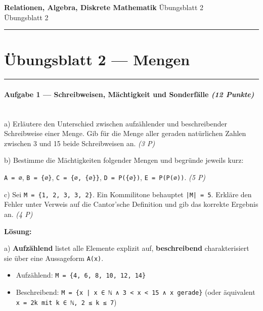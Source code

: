 \documentclass[11pt, a4paper]{article}
\providecommand{\nichttitle}{Übungsblatt}
\providecommand{\nichtsubtitle}{}
\renewcommand{\nichttitle}{Relationen, Algebra, Diskrete Mathematik}
\renewcommand{\nichtsubtitle}{Übungsblatt 2}
\begin{document}
\begin{center}
{\Large\bfseries\color{accent}\nichttitle}
\ifx\nichtsubtitle\empty\else
  \\[2pt]{\normalsize\color{accent!80!black}\nichtsubtitle}
\fi
\\[2pt]
\color{accent}\rule{0.4\linewidth}{0.8pt}\color{black}
\end{center}
\vspace{4pt}


\section{Übungsblatt 2 — Mengen}


\noindent\textcolor{rulegray}{\rule{\linewidth}{0.4pt}}


\paragraph{Aufgabe 1 — Schreibweisen, Mächtigkeit und Sonderfälle \textit{(12 Punkte)}}\mbox{}\\[2pt]

a) Erläutere den Unterschied zwischen aufzählender und beschreibender Schreibweise einer Menge. Gib für die Menge aller geraden natürlichen Zahlen zwischen 3 und 15 beide Schreibweisen an. \textit{(3 P)}


b) Bestimme die Mächtigkeiten folgender Mengen und begründe jeweils kurz:

\texttt{A = ∅}, \texttt{B = \{∅\}}, \texttt{C = \{∅, \{∅\}\}}, \texttt{D = P(\{∅\})}, \texttt{E = P(P(∅))}. \textit{(5 P)}


c) Sei \texttt{M = \{1, 2, 3, 3, 2\}}. Ein Kommilitone behauptet \texttt{|M| = 5}. Erkläre den Fehler unter Verweis auf die Cantor'sche Definition und gib das korrekte Ergebnis an. \textit{(4 P)}


\textbf{Lösung:}


a) \textbf{Aufzählend} listet alle Elemente explizit auf, \textbf{beschreibend} charakterisiert sie über eine Aussageform \texttt{A(x)}.

\begin{itemize}
  \item Aufzählend: \texttt{M = \{4, 6, 8, 10, 12, 14\}}
  \item Beschreibend: \texttt{M = \{x | x ∈ ℕ ∧ 3 < x < 15 ∧ x gerade\}} (oder äquivalent \texttt{x = 2k mit k ∈ ℕ, 2 ≤ k ≤ 7})
\end{itemize}
\end{document}
